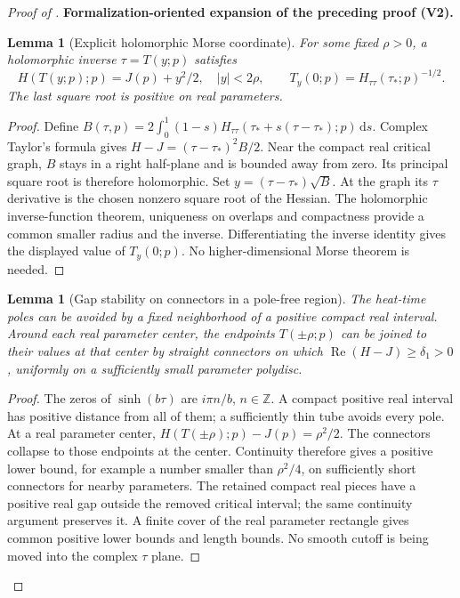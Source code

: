 \documentclass[11pt]{article}
\newtheorem{lemma}[theorem]{Lemma}
\newcommand{\formalisationparentid}{X}
\newenvironment{formalisationaddition}[1]{\par\medskip\begingroup\color{blue}\def\formalisationparentid{#1}\setcounter{formalizationsublemma}{0}\let\lemma\formalizationsublemma\let\endlemma\endformalizationsublemma
  \def\Eo{\mathcal E_h^\circ}\def\EE{\mathcal E_h}\def\phio{\phi_h^\circ}\def\phih{\phi_h}\def\Ho{H_h^{\rm atom}(v^\circ)}\def\Ha{H_h^{\rm atom}}\def\HL{H_h^{L}}\def\Dh{D_h}\def\Log{\operatorname{Log}}\def\ellh{\ell_h}\def\Gp{G_{p,h}}\def\Ast{A_{*,h}}\def\ahat{\widehat{\mathfrak a}_h}\def\ah{\mathfrak a_h}\def\rh{\widehat\rho_h}\def\deltah{\widehat\delta_h}\def\oldref##1{\textup{(##1)}}\def\interface##1{\par\noindent\textit{Analytical interface used here.} ##1\par}\def\finish{\par\noindent\textit{Conclusion of the formalization-oriented expansion.} }\par\noindent\textbf{Formalization-oriented expansion of the preceding proof (V2).}\par\smallskip
}{\par\endgroup\medskip
}
\newcommand{\Rea}{\operatorname{Re}}
\begin{document}
\begin{proof}[Proof of ]
\begin{formalisationaddition}{C-T6.1}
\begin{lemma}[Explicit holomorphic Morse coordinate]\label{sublemma:C6-1-morse}
For some fixed $\rho>0$, a holomorphic inverse $\tau=T(y;p)$ satisfies
\[
 H(T(y;p);p)=J(p)+y^2/2,\quad |y|<2\rho,\qquad
 T_y(0;p)=H_{\tau\tau}(\tau_*;p)^{-1/2}.
\]
The last square root is positive on real parameters.
\end{lemma}
\begin{proof}
Define
$B(\tau,p)=2\int_0^1(1-s)H_{\tau\tau}(\tau_*+s(\tau-\tau_*);p)\,\mathrm ds$.
Complex Taylor's formula gives $H-J=(\tau-\tau_*)^2B/2$.
Near the compact real critical graph, $B$ stays in a right half-plane
and is bounded away from zero. Its principal square root is therefore
holomorphic. Set $y=(\tau-\tau_*)\sqrt B$.
At the graph its $\tau$ derivative is the chosen nonzero square root
of the Hessian. The holomorphic inverse-function theorem, uniqueness
on overlaps and compactness provide a common smaller radius and the
inverse. Differentiating the inverse identity gives the displayed value
of $T_y(0;p)$. No higher-dimensional Morse theorem is needed.
\end{proof}

\begin{lemma}[Gap stability on connectors in a pole-free region]\label{sublemma:C6-1-connector-gap}
The heat-time poles can be avoided by a fixed neighborhood of a positive
compact real interval. Around each real parameter center, the endpoints
$T(\pm\rho;p)$ can be joined to their values at that center by straight
connectors on which $\Rea(H-J)\ge\delta_1>0$, uniformly on a sufficiently
small parameter polydisc.
\end{lemma}
\begin{proof}
The zeros of $\sinh(b\tau)$ are $i\pi n/b$, $n\in\mathbb Z$.
A compact positive real interval has positive distance from all of them;
a sufficiently thin tube avoids every pole.
At a real parameter center, $H(T(\pm\rho);p)-J(p)=\rho^2/2$.
The connectors collapse to those endpoints at the center. Continuity
therefore gives a positive lower bound, for example a number smaller
than $\rho^2/4$, on sufficiently short connectors for nearby parameters.
The retained compact real pieces have a positive real gap outside the
removed critical interval; the same continuity argument preserves it.
A finite cover of the real parameter rectangle gives common positive
lower bounds and length bounds. No smooth cutoff is being moved into
the complex $\tau$ plane.
\end{proof}


\end{formalisationaddition}
\end{proof}
\end{document}
